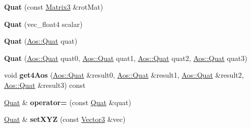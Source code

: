 \begin{DoxyCompactItemize}
\item 
\hypertarget{classVectormath_1_1Soa_1_1Quat_acbcf32cefc7ce414a883be906b9811cd}{{\bfseries Quat} (const \hyperlink{classVectormath_1_1Soa_1_1Matrix3}{Matrix3} \&rot\-Mat)}\label{classVectormath_1_1Soa_1_1Quat_acbcf32cefc7ce414a883be906b9811cd}

\item 
\hypertarget{classVectormath_1_1Soa_1_1Quat_a2daaa4afe6417c53ebe0c7c933407602}{{\bfseries Quat} (vec\-\_\-float4 scalar)}\label{classVectormath_1_1Soa_1_1Quat_a2daaa4afe6417c53ebe0c7c933407602}

\item 
\hypertarget{classVectormath_1_1Soa_1_1Quat_adde7f9915a32ac7ffa0822d1bf917210}{{\bfseries Quat} (\hyperlink{classVectormath_1_1Aos_1_1Quat}{Aos\-::\-Quat} quat)}\label{classVectormath_1_1Soa_1_1Quat_adde7f9915a32ac7ffa0822d1bf917210}

\item 
\hypertarget{classVectormath_1_1Soa_1_1Quat_a685f312becedbdf998ad9bb5aa4a5de4}{{\bfseries Quat} (\hyperlink{classVectormath_1_1Aos_1_1Quat}{Aos\-::\-Quat} quat0, \hyperlink{classVectormath_1_1Aos_1_1Quat}{Aos\-::\-Quat} quat1, \hyperlink{classVectormath_1_1Aos_1_1Quat}{Aos\-::\-Quat} quat2, \hyperlink{classVectormath_1_1Aos_1_1Quat}{Aos\-::\-Quat} quat3)}\label{classVectormath_1_1Soa_1_1Quat_a685f312becedbdf998ad9bb5aa4a5de4}

\item 
\hypertarget{classVectormath_1_1Soa_1_1Quat_a188292ca81f5622822bfd7af34412346}{void {\bfseries get4\-Aos} (\hyperlink{classVectormath_1_1Aos_1_1Quat}{Aos\-::\-Quat} \&result0, \hyperlink{classVectormath_1_1Aos_1_1Quat}{Aos\-::\-Quat} \&result1, \hyperlink{classVectormath_1_1Aos_1_1Quat}{Aos\-::\-Quat} \&result2, \hyperlink{classVectormath_1_1Aos_1_1Quat}{Aos\-::\-Quat} \&result3) const }\label{classVectormath_1_1Soa_1_1Quat_a188292ca81f5622822bfd7af34412346}

\item 
\hypertarget{classVectormath_1_1Soa_1_1Quat_a3637eb59964e949e143ec618322b018e}{\hyperlink{classVectormath_1_1Soa_1_1Quat}{Quat} \& {\bfseries operator=} (const \hyperlink{classVectormath_1_1Soa_1_1Quat}{Quat} \&quat)}\label{classVectormath_1_1Soa_1_1Quat_a3637eb59964e949e143ec618322b018e}

\item 
\hypertarget{classVectormath_1_1Soa_1_1Quat_ae5d2d9dd8e13b2a1e4e1dfae2968e81f}{\hyperlink{classVectormath_1_1Soa_1_1Quat}{Quat} \& {\bfseries set\-X\-Y\-Z} (const \hyperlink{classVectormath_1_1Soa_1_1Vector3}{Vector3} \&vec)}\label{classVectormath_1_1Soa_1_1Quat_ae5d2d9dd8e13b2a1e4e1dfae2968e81f}


\end{DoxyCompactItemize}
